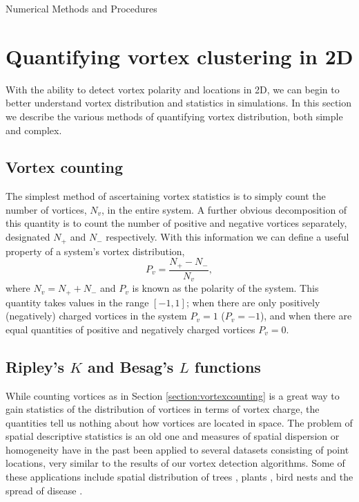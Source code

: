 \begin{chapter}{\label{cha:numerics}Numerical Methods and Procedures}
\section{\label{section:vortexclustering} Quantifying vortex clustering in 2D}
With the ability to detect vortex polarity and locations in 2D, we can begin to better understand vortex distribution and statistics in simulations. In this section we describe the various methods of quantifying vortex distribution, both simple and complex.
  \subsection{\label{section:vortexcounting} Vortex counting}
  The simplest method of ascertaining vortex statistics is to simply count the number of vortices, $N_v$, in the entire system. A further obvious decomposition of this quantity is to count the number of positive and negative vortices separately, designated $N_+$ and $N_-$ respectively. With this information we can define a useful property of a system's vortex distribution,
  \begin{equation}
    P_v = \frac{N_+ - N_-}{N_v},
  \end{equation}
  where $N_v = N_+ + N_-$ and $P_v$ is known as the polarity of the system. This quantity takes values in the range $[-1,1]$; when there are only positively (negatively) charged vortices in the system $P_v=1$ ($P_v=-1$), and when there are equal quantities of positive and negatively charged vortices $P_v=0$.
  \subsection{\label{section:ripleysk} Ripley's $K$ and Besag's $L$ functions }
  While counting vortices as in Section \ref{section:vortexcounting} is a great way to gain statistics of the distribution of vortices in terms of vortex charge, the quantities tell us nothing about how vortices are located in space. The problem of spatial descriptive statistics is an old one and measures of spatial dispersion or homogeneity have in the past been applied to several datasets consisting of point locations, very similar to the results of our vortex detection algorithms. Some of these applications include spatial distribution of trees \cite{duncan_1993,peterson_1995,stoyan_2000}, plants \cite{stamp_1990}, bird nests \cite{gaines_2000} and the spread of disease \cite{diggle_1991}.



\end{chapter}
